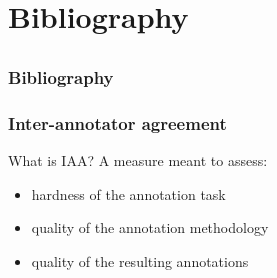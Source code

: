\documentclass[xcolor=dvipsnames]{beamer}
\begin{document}
\begin{frame}
\begin{frame}
\begin{scriptsize}
\end{scriptsize}

\end{frame}


\setcounter{finalframe}{\value{framenumber}}




\setcounter{framenumber}{\value{finalframe}}
\section{Bibliography} %
\subsection{}

\scriptsize{}

\begin{frame}[allowframebreaks]
\frametitle{Bibliography}

\tiny{}

\end{frame}

\setcounter{framenumber}{\value{finalframe}}


\begin{frame}
  \vspace*{-5pt}
  \frametitle{Inter-annotator agreement}


\begin{block}{What is IAA?}
A measure meant to assess:
\begin{itemize}
\item hardness of the annotation task
\item quality of the annotation methodology
\item quality of the resulting annotations
\end{itemize}
\end{block}


\end{frame}
\end{frame}
\end{document}
